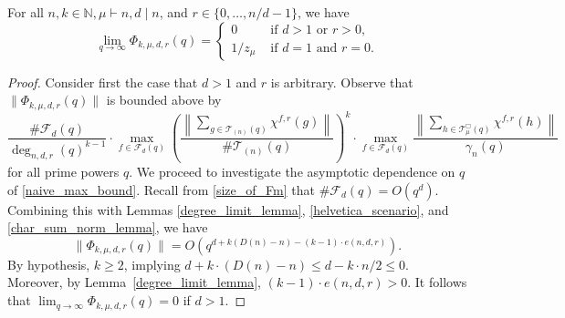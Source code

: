 \documentclass[Unicode,ALCO]{cedram}
\newcommand{\CF}{\mathcal{F}}
\newcommand{\N}{\mathbb{N}}
\newcommand{\CT}{\mathcal{T}}
\begin{document}
\begin{lemma}
\label{Phi_behavior}
For all \(n,k \in \N, \mu \vdash n, d \mid n\), and \(r \in \{0,\ldots,n/d-1\}\), we have
\begin{equation}
\lim_{q \to \infty}
\Phi_{k,\mu,d,r} (q)
=
\begin{cases}
0         & \text{ if } d > 1 \text{ or }  r > 0, \\
1 / z_\mu & \text{ if } d = 1 \text{ and } r = 0.
\end{cases}
\end{equation}
\end{lemma}

\begin{proof}
Consider first the case that \(d > 1\) and \(r\) is arbitrary.
Observe that
\(
\|
\Phi_{k,\mu,d,r} (q)
\|
\)
is bounded above by
\begin{equation}
\label{naive_max_bound}
\frac{
\# \CF_d (q)
}{
\deg_{n,d,r} (q)^{k-1}
}
\cdot
\max_{f \in \CF_d (q)}
\left (
\frac{\left \| \sum_{g \in \CT_{(n)}(q)} \chi^{f,r}(g) \right \|}{\# \CT_{(n)}(q)}
\right )^k
\cdot
\max_{f \in \CF_d(q)}
\frac{\left \| \sum_{h \in \CT^\Box_\mu(q)} \chi^{f,r}(h) \right \|}{\gamma_n(q)}
\end{equation}
for all prime powers \(q\).
We proceed to investigate the asymptotic dependence on \(q\) of \eqref{naive_max_bound}.
Recall from \eqref{size_of_Fm} that \(\# \CF_d (q) = O(q^d)\).
Combining this with Lemmas \ref{degree_limit_lemma},
\ref{helvetica_scenario},
and
\ref{char_sum_norm_lemma},
we have
\begin{equation}
\| \Phi_{k,\mu,d,r} (q) \|
=
O \left ( q^{d + k (D(n) - n) - (k-1) \cdot e(n,d,r)} \right ).
\end{equation}
By hypothesis, \(k \geq 2\), implying \(d  + k \cdot (D(n) - n) \leq d - k \cdot n/2 \leq 0\).
Moreover, by Lemma~\ref{degree_limit_lemma}, \((k-1)\cdot e(n,d,r) > 0\).
It follows that \(\lim_{q \to \infty} \Phi_{k,\mu,d,r} (q) = 0\) if \(d > 1\).


\end{proof}
\end{document}
